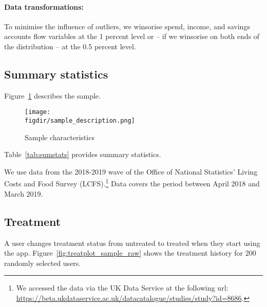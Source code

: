 \paragraph{Data transformations:}%
\label{par:data_transformations}

To minimise the influence of outliers, we winsorise spend, income, and savings
accounts flow variables at the 1 percent level or -- if we winsorise on both
ends of the distribution -- at the 0.5 percent level.


\subsection{Summary statistics}%
\label{sub:summary_statistics}

Figure~\ref{fig:sample_description} describes the sample.

\begin{figure}[H]
    \centering
    \caption{Sample characteristics}
    \texttt{[image: \\figdir/sample\_description.png]}
    \label{fig:sample_description}
\end{figure}

Table~\ref{tab:sumstats} provides summary statistics.



We use data from the 2018-2019 wave of the Office of National Statistics' Living Costs and Food
Survey (LCFS).\footnote{We accessed the data via the UK Data Service at the
following url:
\url{https://beta.ukdataservice.ac.uk/datacatalogue/studies/study?id=8686}.}
Data covers the period between April 2018 and March 2019.



\subsection{Treatment}%
\label{sub:treatment}

A user changes treatment status from untreated to treated when they start using
the app. Figure~\ref{fig:treatplot_sample_raw} shows the treatment history for
200 randomly selected users.

